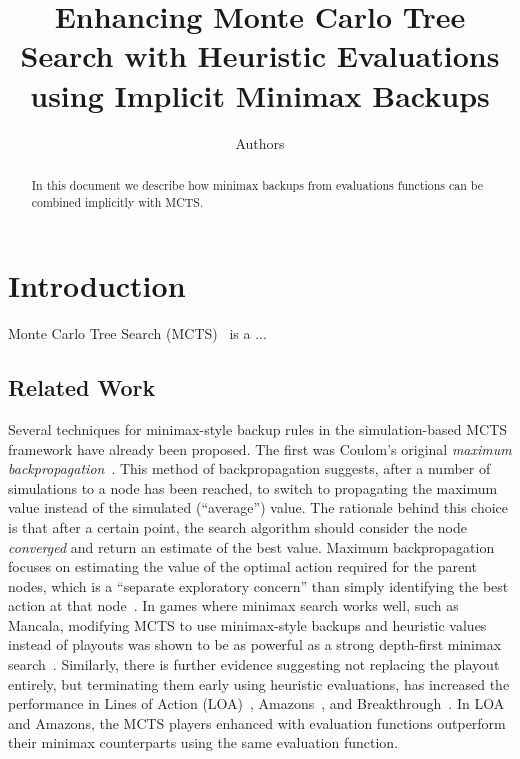\documentclass{article}
\begin{document}
\title{Enhancing Monte Carlo Tree Search with Heuristic Evaluations using Implicit Minimax Backups}

\author{Authors}

\maketitle

\begin{abstract}
In this document we describe how minimax backups from evaluations functions can be combined implicitly 
with MCTS. 
\end{abstract}

\section{Introduction}

Monte Carlo Tree Search (MCTS)~\cite{mctssurvey,Coulom06Efficient,Kocsis06Bandit} is a ... 

\subsection{Related Work}

Several techniques for minimax-style backup rules in the simulation-based MCTS framework have already been proposed. 
The first was Coulom's original {\it maximum backpropagation}~\cite{Coulom06Efficient}. This method of backpropagation
suggests, after a number of simulations to a node has been reached, to switch to propagating the maximum value instead 
of the simulated (``average'') value. 
The rationale behind this choice is that after a certain point, the search algorithm should consider the node
{\it converged} and return an estimate of the best value. 
Maximum backpropagation focuses on estimating the value of the optimal action required for the parent nodes, which is a
``separate exploratory concern'' than simply identifying the best action at that node~\cite{Feldman13Theoretically}.
In games where minimax search works well, such as Mancala, modifying MCTS to 
use minimax-style backups and heuristic values instead of playouts was shown to be as powerful as a strong 
depth-first minimax search~\cite{Ramanujan11Tradeoffs}.
Similarly, there is further evidence suggesting not replacing the playout entirely, but terminating them early 
using heuristic evaluations, has increased the performance in Lines of Action (LOA)~\cite{Winands10MCTS-LOA}, 
Amazons~\cite{Kloetzer10Amazons,Lorentz08Amazons}, and Breakthrough~\cite{Lorentz13Breakthrough}. In LOA and Amazons, the 
MCTS players enhanced with evaluation functions outperform their minimax counterparts using the same evaluation function.
\end{document}
